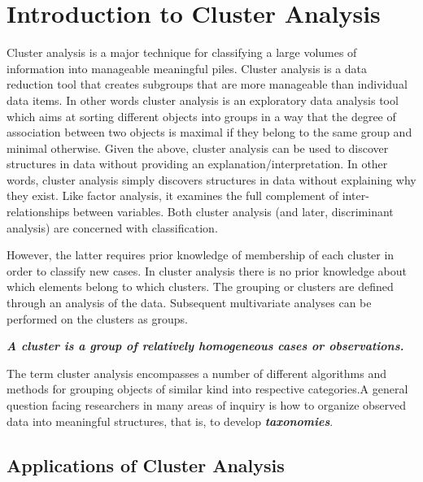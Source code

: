 \documentclass[a4paper,12pt]{article}
\begin{document}


\tableofcontents
\newpage

\section{Introduction to Cluster Analysis}


Cluster analysis is a major technique for classifying a large volumes of information into
manageable meaningful piles. Cluster analysis is a data reduction tool that creates subgroups that are
more manageable than individual data items. In other words cluster analysis is an exploratory data analysis tool which aims at sorting different objects into groups in a way that the degree of association between two objects is maximal if they belong to the same group and minimal otherwise. Given the above, cluster analysis can be used to discover structures in data without providing an explanation/interpretation. In other words, cluster analysis simply discovers structures in data without explaining why they exist. Like factor analysis, it examines the full complement
of inter-relationships between variables. Both cluster analysis (and later, discriminant
analysis) are concerned with classification.

However, the latter requires prior knowledge of membership of each cluster in order to classify new cases. In cluster analysis
there is no prior knowledge about which elements belong to which clusters. The grouping
or clusters are defined through an analysis of the data. Subsequent multivariate analyses
can be performed on the clusters as groups.

\textbf{\textit{A cluster is a group of relatively homogeneous cases or observations.}}


The term cluster analysis encompasses a number of different algorithms and methods for grouping objects of similar kind into respective categories.A general question facing researchers in many areas of inquiry is how to organize observed data into meaningful structures, that is, to develop \textbf{\emph{taxonomies}}.

\subsection{Applications of Cluster Analysis}
\end{document}

